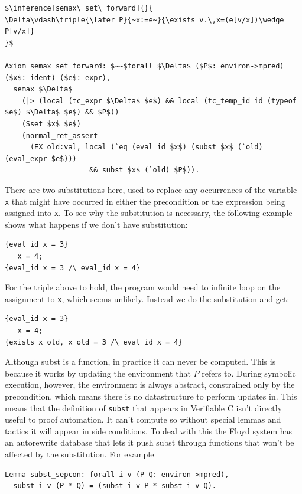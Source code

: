 \documentclass{puthesis}
\begin{document}
\begin{lstlisting}
$\inference[semax\_set\_forward]{}{
\Delta\vdash\triple{\later P}{~x:=e~}{\exists v.\,x=(e[v/x])\wedge P[v/x]}
}$

Axiom semax_set_forward: $~~$forall $\Delta$ ($P$: environ->mpred) ($x$: ident) ($e$: expr),
  semax $\Delta$
    (|> (local (tc_expr $\Delta$ $e$) && local (tc_temp_id id (typeof $e$) $\Delta$ $e$) && $P$))
    (Sset $x$ $e$) 
    (normal_ret_assert 
      (EX old:val, local (`eq (eval_id $x$) (subst $x$ (`old) (eval_expr $e$)))
                    && subst $x$ (`old) $P$)).
\end{lstlisting}

There are two substitutions here, used to replace any occurrences of
the variable \lstinline|x| that might have occurred in either the
precondition or the expression being assigned into \lstinline|x|. To
see why the substitution is necessary, the following example shows
what happens if we don't have substitution:

\begin{verbatim}
{eval_id x = 3}
   x = 4;
{eval_id x = 3 /\ eval_id x = 4}
\end{verbatim}

For the triple above to hold, the program would need to infinite loop
on the assignment to \lstinline|x|, which seems unlikely. Instead we
do the substitution and get:

\begin{verbatim}
{eval_id x = 3}
   x = 4;
{exists x_old, x_old = 3 /\ eval_id x = 4}
\end{verbatim}


Although subst is a function, in practice it can never be computed.
This is because it works by updating the environment that $P$ refers
to. During symbolic execution, however, the environment is always
abstract, constrained only by the precondition, which means there is
no datastructure to perform updates in. This means that the definition of
\lstinline|subst| that appears in Verifiable C isn't directly useful
to proof automation. It can't compute so without special lemmas and
tactics it will appear in side conditions. To deal with this the Floyd
system has an autorewrite database that lets it push subst through
functions that won't be affected by the substitution. For example

\begin{verbatim}
Lemma subst_sepcon: forall i v (P Q: environ->mpred),
  subst i v (P * Q) = (subst i v P * subst i v Q).
\end{verbatim}
\end{document}
